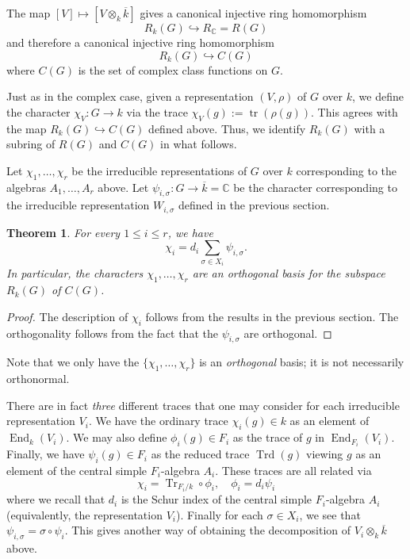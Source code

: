 \documentclass[12pt]{article}
\theoremstyle{plain}
\newtheorem{theorem}{Theorem}[section]
\theoremstyle{definition}
\theoremstyle{remark}
\numberwithin{equation}{section}
\begin{document}
The map $[V] \mapsto [V \otimes_k \overline{k}]$
gives a canonical injective ring homomorphism
\[
R_k(G) \hookrightarrow R_{\mathbb{C}} = R(G)
\]
and therefore a canonical injective ring homomorphism
\[
R_k(G) \hookrightarrow C(G)
\]
where $C(G)$ is the set of complex class functions on $G$.

Just as in the complex case, given a representation $(V,\rho)$
of $G$ over $k$, we define the character
$\chi_V : G \to k$
via the trace $\chi_V(g) := \operatorname{tr}(\rho(g))$.
This agrees with the map $R_k(G) \hookrightarrow C(G)$ defined above.
Thus, we identify $R_k(G)$ with a subring of $R(G)$ and $C(G)$ in what
follows.

Let $\chi_1,\ldots,\chi_r$ be the irreducible representations of $G$
over $k$ corresponding to the algebras $A_1,\ldots, A_r$ above.
Let $\psi_{i,\sigma} : G \to \overline{k}=\mathbb{C}$ be the character
corresponding to the irreducible representation $W_{i,\sigma}$
defined in the previous section.

\begin{theorem}
For every $1 \le i \le r$, we have
\[
\chi_i = d_i \sum_{\sigma \in X_i} \psi_{i,\sigma} .
\]
In particular, the characters $\chi_1,\ldots, \chi_r$
are an orthogonal basis for the subspace $R_k(G)$ of $C(G)$.
\end{theorem}

\begin{proof}
The description of $\chi_i$ follows from the results in the previous
section.
The orthogonality follows from the fact that the $\psi_{i,\sigma}$
are orthogonal.
\end{proof}

Note that we only have the $\{\chi_1,\ldots,\chi_r\}$ is an
\emph{orthogonal} basis; it is not necessarily orthonormal.

There are in fact \emph{three} different traces that one may consider
for each irreducible representation $V_i$.
We have the ordinary trace $\chi_i(g) \in k$ as an element of
$\operatorname{End}_k(V_i)$.
We may also define $\phi_i(g) \in F_i$ as the trace of $g$ in
$\operatorname{End}_{F_i}(V_i)$.
Finally, we have $\psi_i(g) \in F_i$ as the reduced trace
$\operatorname{Trd}(g)$ viewing $g$ as an element of the central simple
$F_i$-algebra $A_i$.
These traces are all related via
\[
\chi_i = \operatorname{Tr}_{F_i/k} \circ \phi_i, \quad
\phi_i = d_i \psi_i
\]
where we recall that $d_i$ is the Schur index of the central simple
$F_i$-algebra $A_i$ (equivalently, the representation $V_i$).
Finally for each $\sigma \in X_i$, we see that $\psi_{i,\sigma} = \sigma
\circ \psi_i$.
This gives another way of obtaining the decomposition of $V_i \otimes_k
\overline{k}$ above.
\end{document}
